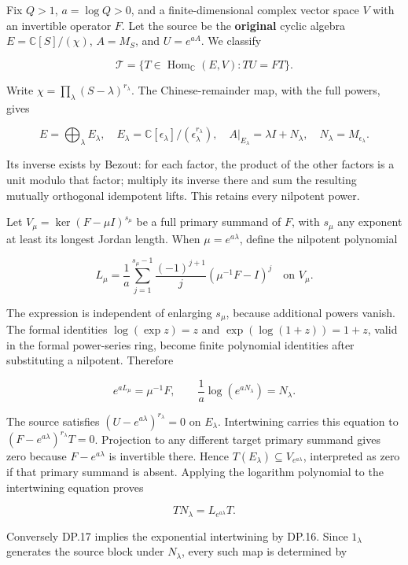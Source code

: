 Fix \(Q>1\), \(a=\log Q>0\), and a finite-dimensional complex vector space \(V\) with an invertible operator \(F\). Let the source be the \textbf{original} cyclic algebra \(E=\mathbb C[S]/(\chi)\), \(A=M_S\), and \(U=e^{aA}\). We classify

\[
\mathscr T=\{T\in\operatorname{Hom}_{\mathbb C}(E,V):TU=FT\}.
\tag{DP.13}
\]

Write \(\chi=\prod_{\lambda}(S-\lambda)^{r_\lambda}\). The Chinese-remainder map, with the full powers, gives

\[
E=\bigoplus_\lambda E_\lambda,
\quad E_\lambda=\mathbb C[\epsilon_\lambda]/(\epsilon_\lambda^{r_\lambda}),
\quad A|_{E_\lambda}=\lambda I+N_\lambda,
\quad N_\lambda=M_{\epsilon_\lambda}.
\tag{DP.14}
\]

Its inverse exists by Bezout: for each factor, the product of the other factors is a unit modulo that factor; multiply its inverse there and sum the resulting mutually orthogonal idempotent lifts. This retains every nilpotent power.

Let \(V_\mu=\ker(F-\mu I)^{s_\mu}\) be a full primary summand of \(F\), with \(s_\mu\) any exponent at least its longest Jordan length. When \(\mu=e^{a\lambda}\), define the nilpotent polynomial

\[
L_\mu=\frac1a\sum_{j=1}^{s_\mu-1}
 \frac{(-1)^{j+1}}j(\mu^{-1}F-I)^j
\quad\text{on }V_\mu.
\tag{DP.15}
\]

The expression is independent of enlarging \(s_\mu\), because additional powers vanish. The formal identities \(\log(\exp z)=z\) and \(\exp(\log(1+z))=1+z\), valid in the formal power-series ring, become finite polynomial identities after substituting a nilpotent. Therefore

\[
e^{aL_\mu}=\mu^{-1}F,
\qquad \frac1a\log(e^{aN_\lambda})=N_\lambda.
\tag{DP.16}
\]

The source satisfies \((U-e^{a\lambda})^{r_\lambda}=0\) on \(E_\lambda\). Intertwining carries this equation to \((F-e^{a\lambda})^{r_\lambda}T=0\). Projection to any different target primary summand gives zero because \(F-e^{a\lambda}\) is invertible there. Hence \(T(E_\lambda)\subseteq V_{e^{a\lambda}}\), interpreted as zero if that primary summand is absent. Applying the logarithm polynomial to the intertwining equation proves

\[
TN_\lambda=L_{e^{a\lambda}}T.
\tag{DP.17}
\]

Conversely DP.17 implies the exponential intertwining by DP.16. Since \(1_\lambda\) generates the source block under \(N_\lambda\), every such map is determined by

